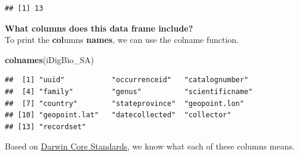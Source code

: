 \documentclass[
]{book}
\newenvironment{Shaded}{\begin{snugshade}}{\end{snugshade}}
\newcommand{\KeywordTok}[1]{\textcolor[rgb]{0.13,0.29,0.53}{\textbf{#1}}}
\newcommand{\NormalTok}[1]{#1}
\begin{document}
\begin{verbatim}
## [1] 13
\end{verbatim}

\textbf{What columns does this data frame include?}\\
To print the \textbf{col}umns \textbf{names}, we can use the colname function.

\begin{Shaded}
\begin{Highlighting}[]
\KeywordTok{colnames}\NormalTok{(iDigBio\_SA)}
\end{Highlighting}
\end{Shaded}

\begin{verbatim}
##  [1] "uuid"           "occurrenceid"   "catalognumber" 
##  [4] "family"         "genus"          "scientificname"
##  [7] "country"        "stateprovince"  "geopoint.lon"  
## [10] "geopoint.lat"   "datecollected"  "collector"     
## [13] "recordset"
\end{verbatim}

Based on \href{https://dwc.tdwg.org/}{Darwin Core Standards}, we know what each of these columns means.
\end{document}
